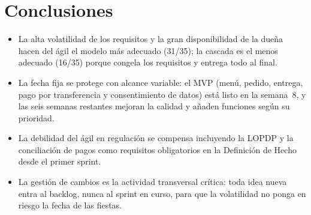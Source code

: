 \documentclass[11pt,a4paper]{article}
\begin{document}
\section{Conclusiones}

\begin{itemize}
  \item La alta volatilidad de los requisitos y la gran disponibilidad de la
  dueña hacen del ágil el modelo más adecuado (31/35); la cascada es el menos
  adecuado (16/35) porque congela los requisitos y entrega todo al final.
  \item La fecha fija se protege con alcance variable: el MVP (menú, pedido,
  entrega, pago por transferencia y consentimiento de datos) está listo en la
  semana~8, y las seis semanas restantes mejoran la calidad y añaden
  funciones según su prioridad.
  \item La debilidad del ágil en regulación se compensa incluyendo la LOPDP y
  la conciliación de pagos como requisitos obligatorios en la Definición de
  Hecho desde el primer sprint.
  \item La gestión de cambios es la actividad transversal crítica: toda idea
  nueva entra al backlog, nunca al sprint en curso, para que la volatilidad no
  ponga en riesgo la fecha de las fiestas.
\end{itemize}

\renewcommand{\refname}{Referencias}
{\small

}
\end{document}
